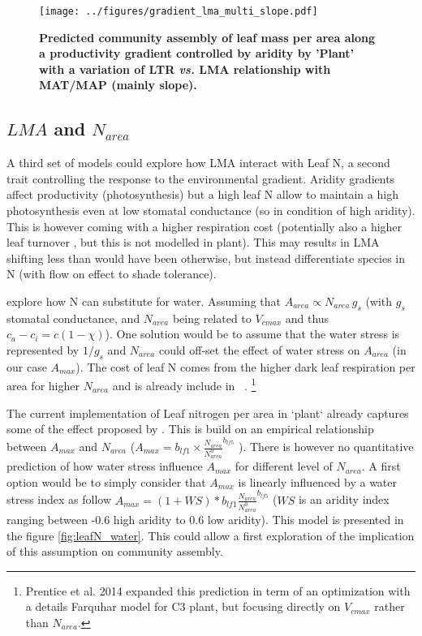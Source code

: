 \documentclass[a4paper,11pt]{article}
\begin{document}
\begin{figure}[ht]
\centering
\texttt{[image: ../figures/gradient\_lma\_multi\_slope.pdf]}
\caption{\textbf{Predicted community assembly of leaf mass per area
    along a productivity gradient controlled by aridity by 'Plant'
    with a variation of LTR \textit{vs.} LMA relationship with MAT/MAP
    (mainly slope).}
\label{fig:lma_mat_o_map}}
\end{figure}


\clearpage

\subsection{$LMA$ and $N_{area}$}

A third set of models could explore how LMA interact with Leaf N, a second trait controlling the response to the environmental gradient. Aridity gradients affect productivity (photosynthesis) but a
high leaf N allow to maintain a high photosynthesis even at low
stomatal conductance (so in condition of high aridity). This is
however coming with a higher respiration cost (potentially also a higher leaf turnover \citep{Wright-2002a,Wright-2002b}, but this is not modelled in plant). This may results in LMA shifting less than would have been otherwise, but instead differentiate species in N (with flow on effect to shade tolerance).


 \citet{Wright-2003} explore how N can substitute for water. Assuming that $A_{area} \propto N_{area} \, g_s$ (with $g_s$ stomatal conductance, and $N_{area}$ being related to $V_{cmax}$ and thus $c_a - c_i = c(1-\chi)$). One solution would be to assume that the water stress is represented by $1/g_s$ and $N_{area}$ could off-set the effect of water stress on $A_{area}$ (in our case $A_{max}$). The cost of leaf N comes from the higher dark leaf respiration per area for higher $N_{area}$ and is already include in \plant\ . \footnote{Prentice et al. 2014 expanded this prediction in term of an optimization with a details Farquhar model for C3 plant, but focusing directly on $V_{cmax}$ rather than $N_{area}$.}

 The current implementation of Leaf nitrogen per area in `plant` already captures some of the effect proposed by \citet{Wright-2003}. This is build on an empirical relationship between $A_{max}$ and $N_{area}$
($A_{max} = b_{lf1} \times \frac{N_{area}}{N^0_{area}}^{b_{lf5}}$ \citep{Falster-2016}). There is however no quantitative prediction of how water stress influence $A_{max}$ for different level of $N_{area}$. A first option would be to simply consider that $A_{max}$ is linearly influenced by a water stress index  as follow $A_{max} = (1+WS) * b_{lf1} \frac{N_{area}}{N^0_{area}}^{b_{lf5}}$ ($WS$ is an aridity index ranging between -0.6 high aridity to 0.6 low aridity). This model is presented in the figure \ref{fig:leafN_water}. This could allow a first exploration of the implication of this assumption on community assembly.
\end{document}
